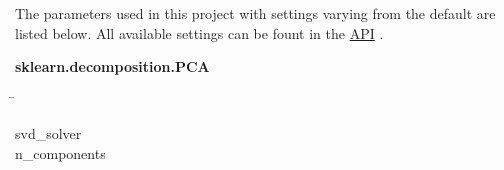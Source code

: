 





The parameters used in this project with settings varying from the default are listed below. All available settings can be fount in the
\href{https://scikit-learn.org/stable/modules/generated/sklearn.decomposition.PCA.html}{API} \autocite{pedregosa_scikit-learn_2011}.


\begin{leftbar}
    \textbf{sklearn.decomposition.PCA}
    \begin{nstabbing}
        \qquad\qquad\qquad\qquad\qquad\quad\=\kill

        svd\_solver \\
        n\_components 
    \end{nstabbing}
\end{leftbar}